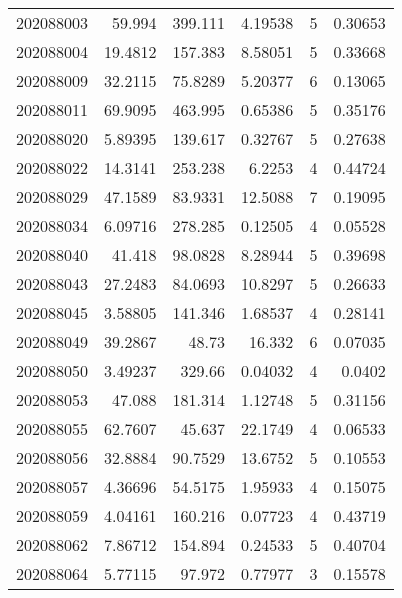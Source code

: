 \begin{tabular}{rrrrrr}
 202088003 &         59.994   &      399.111  &            4.19538 &           5 & 0.30653 \\
 202088004 &         19.4812  &      157.383  &            8.58051 &           5 & 0.33668 \\
 202088009 &         32.2115  &       75.8289 &            5.20377 &           6 & 0.13065 \\
 202088011 &         69.9095  &      463.995  &            0.65386 &           5 & 0.35176 \\
 202088020 &          5.89395 &      139.617  &            0.32767 &           5 & 0.27638 \\
 202088022 &         14.3141  &      253.238  &            6.2253  &           4 & 0.44724 \\
 202088029 &         47.1589  &       83.9331 &           12.5088  &           7 & 0.19095 \\
 202088034 &          6.09716 &      278.285  &            0.12505 &           4 & 0.05528 \\
 202088040 &         41.418   &       98.0828 &            8.28944 &           5 & 0.39698 \\
 202088043 &         27.2483  &       84.0693 &           10.8297  &           5 & 0.26633 \\
 202088045 &          3.58805 &      141.346  &            1.68537 &           4 & 0.28141 \\
 202088049 &         39.2867  &       48.73   &           16.332   &           6 & 0.07035 \\
 202088050 &          3.49237 &      329.66   &            0.04032 &           4 & 0.0402  \\
 202088053 &         47.088   &      181.314  &            1.12748 &           5 & 0.31156 \\
 202088055 &         62.7607  &       45.637  &           22.1749  &           4 & 0.06533 \\
 202088056 &         32.8884  &       90.7529 &           13.6752  &           5 & 0.10553 \\
 202088057 &          4.36696 &       54.5175 &            1.95933 &           4 & 0.15075 \\
 202088059 &          4.04161 &      160.216  &            0.07723 &           4 & 0.43719 \\
 202088062 &          7.86712 &      154.894  &            0.24533 &           5 & 0.40704 \\
 202088064 &          5.77115 &       97.972  &            0.77977 &           3 & 0.15578 \\

\end{tabular}
